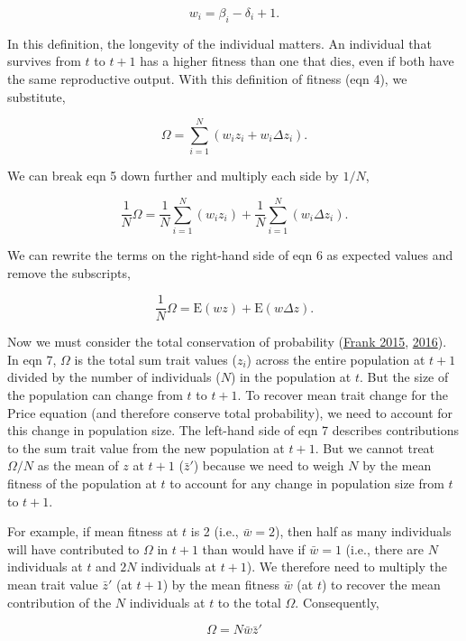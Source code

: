\documentclass[
]{article}
\begin{document}
\[w_{i} = \beta_{i} - \delta_{i} + 1.
\tag{4}
\]

In this definition, the longevity of the individual matters. An
individual that survives from \(t\) to \(t + 1\) has a higher fitness
than one that dies, even if both have the same reproductive output. With
this definition of fitness (eqn 4), we substitute,

\[\Omega = \sum_{i=1}^{N} \left(w_{i}z_{i} + w_{i}\Delta z_{i} \right).
\tag{5}
\]

We can break eqn 5 down further and multiply each side by \(1/N\),

\[\frac{1}{N}\Omega = \frac{1}{N}\sum_{i=1}^{N} \left(w_{i}z_{i} \right) + \frac{1}{N}\sum_{i=1}^{N}\left( w_{i}\Delta z_{i} \right).
\tag{6}
\]

We can rewrite the terms on the right-hand side of eqn 6 as expected
values and remove the subscripts,

\[\frac{1}{N}\Omega = \mathrm{E}\left(w z \right) + \mathrm{E}\left( w \Delta z  \right).
\tag{7}
\]

Now we must consider the total conservation of probability
(\protect\hyperlink{ref-Frank2015}{Frank 2015},
\protect\hyperlink{ref-Frank2016}{2016}). In eqn 7, \(\Omega\) is the
total sum trait values (\(z_{i}\)) across the entire population at
\(t + 1\) divided by the number of individuals (\(N\)) in the population
at \(t\). But the size of the population can change from \(t\) to
\(t + 1\). To recover mean trait change for the Price equation (and
therefore conserve total probability), we need to account for this
change in population size. The left-hand side of eqn 7 describes
contributions to the sum trait value from the new population at
\(t + 1\). But we cannot treat \(\Omega/N\) as the mean of \(z\) at
\(t+1\) (\(\bar{z}'\)) because we need to weigh \(N\) by the mean
fitness of the population at \(t\) to account for any change in
population size from \(t\) to \(t+1\).

For example, if mean fitness at \(t\) is 2 (i.e., \(\bar{w} = 2\)), then
half as many individuals will have contributed to \(\Omega\) in
\(t + 1\) than would have if \(\bar{w} = 1\) (i.e., there are \(N\)
individuals at \(t\) and \(2N\) individuals at \(t + 1\)). We therefore
need to multiply the mean trait value \(\bar{z}'\) (at \(t + 1\)) by the
mean fitness \(\bar{w}\) (at \(t\)) to recover the mean contribution of
the \(N\) individuals at \(t\) to the total \(\Omega\). Consequently,

\[\Omega = N\bar{w}\bar{z}'
\tag{8}
\]
\end{document}
